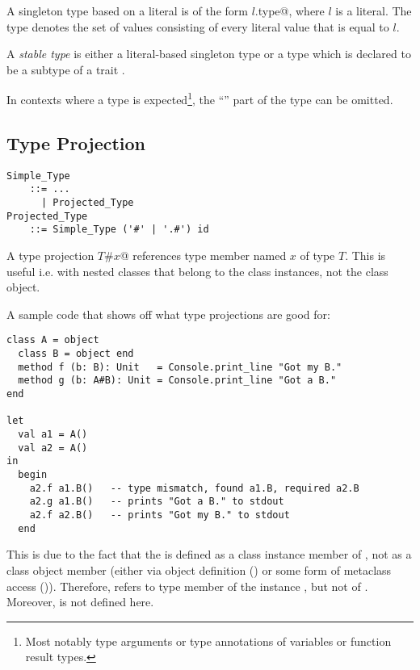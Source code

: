 A singleton type based on a literal is of the form \lstinline@$l$.type@, where $l$ is a literal. The type denotes the set of values consisting of every literal value that is equal to $l$. 

A {\em stable type} is either a literal-based singleton type or a type which is declared to be a subtype of a trait . 

In contexts where a type is expected\footnote{Most notably type arguments or type annotations of variables or function result types.}, the ``'' part of the type can be omitted. 





\subsection{Type Projection}
\label{sec:type-projection}

\grammar\begin{lstlisting}
Simple_Type 
    ::= ...
      | Projected_Type
Projected_Type
    ::= Simple_Type ('#' | '.#') id
\end{lstlisting}

A type projection \lstinline@$T$#$x$@ references type member named $x$ of type $T$. This is useful i.e. with nested classes that belong to the class instances, not the class object. 

\example A sample code that shows off what type projections are good for:
\begin{lstlisting}
class A = object
  class B = object end
  method f (b: B): Unit   = Console.print_line "Got my B."
  method g (b: A#B): Unit = Console.print_line "Got a B."
end

let 
  val a1 = A()
  val a2 = A() 
in
  begin
    a2.f a1.B()   -- type mismatch, found a1.B, required a2.B
    a2.g a1.B()   -- prints "Got a B." to stdout
    a2.f a2.B()   -- prints "Got my B." to stdout
  end
\end{lstlisting}
This is due to the fact that the  is defined as a class instance member of , not as a class object member (either via object definition () or some form of metaclass access ()). Therefore,  refers to type member  of the instance , but not of . Moreover,  is not defined here. 







